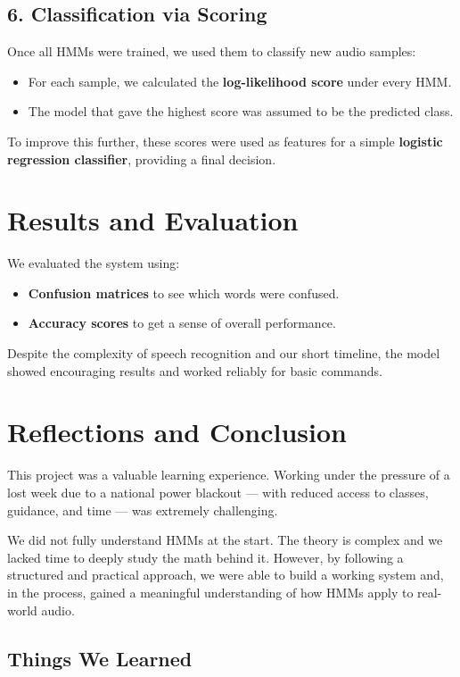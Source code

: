 \documentclass[11pt]{article}
\begin{document}
\subsection*{6. Classification via Scoring}

Once all HMMs were trained, we used them to classify new audio samples:
\begin{itemize}
    \item For each sample, we calculated the \textbf{log-likelihood score} under every HMM.
    \item The model that gave the highest score was assumed to be the predicted class.
\end{itemize}

To improve this further, these scores were used as features for a simple \textbf{logistic regression classifier}, providing a final decision.

\section*{Results and Evaluation}

We evaluated the system using:
\begin{itemize}
    \item \textbf{Confusion matrices} to see which words were confused.
    \item \textbf{Accuracy scores} to get a sense of overall performance.
\end{itemize}

Despite the complexity of speech recognition and our short timeline, the model showed encouraging results and worked reliably for basic commands.

\section*{Reflections and Conclusion}

This project was a valuable learning experience. Working under the pressure of a lost week due to a national power blackout — with reduced access to classes, guidance, and time — was extremely challenging.

We did not fully understand HMMs at the start. The theory is complex and we lacked time to deeply study the math behind it. However, by following a structured and practical approach, we were able to build a working system and, in the process, gained a meaningful understanding of how HMMs apply to real-world audio.

\subsection*{Things We Learned}
\end{document}
